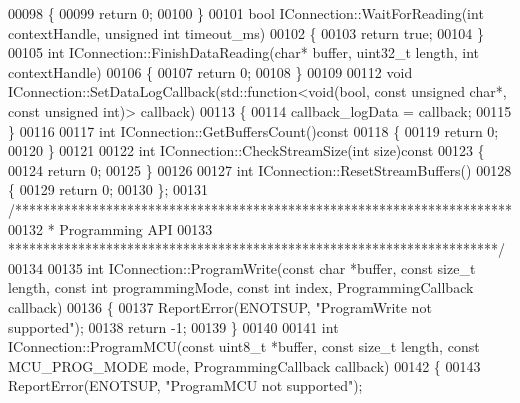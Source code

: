 \begin{DoxyCode}
00098 \{
00099     \textcolor{keywordflow}{return} 0;
00100 \}
00101 \textcolor{keywordtype}{bool} IConnection::WaitForReading(\textcolor{keywordtype}{int} contextHandle, \textcolor{keywordtype}{unsigned} \textcolor{keywordtype}{int} timeout_ms)
00102 \{
00103     \textcolor{keywordflow}{return} \textcolor{keyword}{true};
00104 \}
00105 \textcolor{keywordtype}{int} IConnection::FinishDataReading(\textcolor{keywordtype}{char}* buffer, uint32\_t length, \textcolor{keywordtype}{int} contextHandle)
00106 \{
00107     \textcolor{keywordflow}{return} 0;
00108 \}
00109 
00112 \textcolor{keywordtype}{void} IConnection::SetDataLogCallback(std::function<\textcolor{keywordtype}{void}(\textcolor{keywordtype}{bool}, \textcolor{keyword}{const} \textcolor{keywordtype}{unsigned} \textcolor{keywordtype}{char}*, \textcolor{keyword}{const} \textcolor{keywordtype}{unsigned} \textcolor{keywordtype}{int})> 
      callback)
00113 \{
00114     callback_logData = callback;
00115 \}
00116 
00117 \textcolor{keywordtype}{int} IConnection::GetBuffersCount()\textcolor{keyword}{const}
00118 \textcolor{keyword}{}\{
00119  \textcolor{keywordflow}{return} 0;   
00120 \}
00121 
00122 \textcolor{keywordtype}{int} IConnection::CheckStreamSize(\textcolor{keywordtype}{int} size)\textcolor{keyword}{const}
00123 \textcolor{keyword}{}\{
00124     \textcolor{keywordflow}{return} 0;
00125 \}
00126 
00127 \textcolor{keywordtype}{int} IConnection::ResetStreamBuffers()
00128 \{
00129     \textcolor{keywordflow}{return} 0;
00130 \};
00131 \textcolor{comment}{/***********************************************************************}
00132 \textcolor{comment}{ * Programming API}
00133 \textcolor{comment}{ **********************************************************************/}
00134 
00135 \textcolor{keywordtype}{int} IConnection::ProgramWrite(\textcolor{keyword}{const} \textcolor{keywordtype}{char} *buffer, \textcolor{keyword}{const} \textcolor{keywordtype}{size\_t} length, \textcolor{keyword}{const} \textcolor{keywordtype}{int} programmingMode, \textcolor{keyword}{const} \textcolor{keywordtype}{int}
       index, ProgrammingCallback callback)
00136 \{
00137     ReportError(ENOTSUP, \textcolor{stringliteral}{"ProgramWrite not supported"});
00138     \textcolor{keywordflow}{return} -1;
00139 \}
00140 
00141 \textcolor{keywordtype}{int} IConnection::ProgramMCU(\textcolor{keyword}{const} uint8\_t *buffer, \textcolor{keyword}{const} \textcolor{keywordtype}{size\_t} length, \textcolor{keyword}{const} 
      MCU_PROG_MODE mode, ProgrammingCallback callback)
00142 \{
00143     ReportError(ENOTSUP, \textcolor{stringliteral}{"ProgramMCU not supported"});

\end{DoxyCode}

